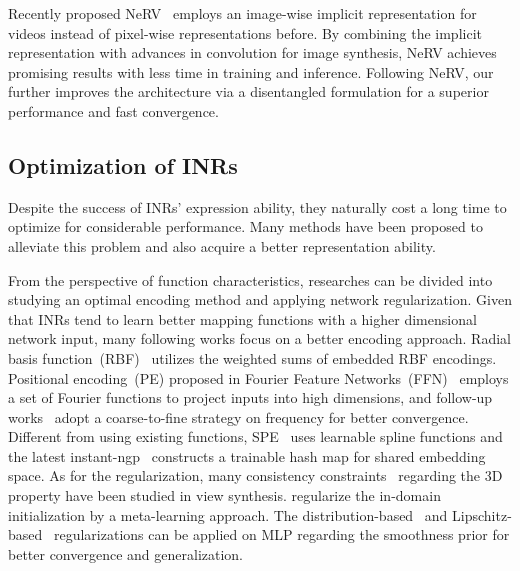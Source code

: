 \documentclass[runningheads]{llncs}
\begin{document}
Recently proposed NeRV~\cite{chen2021nerv} employs an image-wise implicit representation for videos instead of pixel-wise representations before. By combining the implicit representation with advances in convolution for image synthesis, NeRV achieves promising results with less time in training and inference. Following NeRV, our \netname further improves the architecture via a disentangled formulation for a superior performance and fast convergence.

\subsection{Optimization of INRs}

Despite the success of INRs' expression ability, they naturally cost a long time to optimize for considerable performance. Many methods have been proposed to alleviate this problem and also acquire a better representation ability.

From the perspective of function characteristics, researches can be divided into studying an optimal encoding method and applying network regularization. Given that INRs tend to learn better mapping functions with a higher dimensional network input, many following works focus on a better encoding approach. Radial basis function~(RBF)~\cite{dash2016radial} utilizes the weighted sums of embedded RBF encodings. Positional encoding~(PE) proposed in Fourier Feature Networks~(FFN)~\cite{tancik2020fourier} employs a set of Fourier functions to project inputs into high dimensions, and follow-up works~\cite{lin2021barf,hertz2021sape} adopt a coarse-to-fine strategy on frequency for better convergence. Different from using existing functions, SPE~\cite{wang2021spline} uses learnable spline functions and the latest instant-ngp~\cite{muller2022instant} constructs a trainable hash map for shared embedding space. As for the regularization, many consistency constraints~\cite{jain2021putting,deng2021depth,niemeyer2021regnerf} regarding the 3D property have been studied in view synthesis. \cite{tancik2021learned} regularize the in-domain initialization by a meta-learning approach. The distribution-based~\cite{ramasinghe2022regularizing} and Lipschitz-based~\cite{liu2022learning} regularizations can be applied on MLP regarding the smoothness prior for better convergence and generalization.
\end{document}
